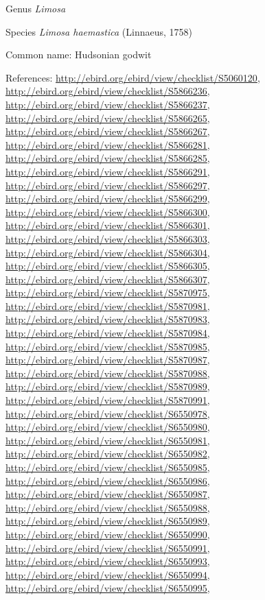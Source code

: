 \documentclass[9pt, article]{memoir}
\begin{document}
\begin{multicols}{2}
\vspace{6pt}\noindent\hspace{30pt}Genus \textit{Limosa}


\vspace{6pt}\noindent\hspace{36pt}Species \textit{Limosa haemastica} (Linnaeus, 1758)


Common name: Hudsonian godwit

References: 
\url{http://ebird.org/ebird/view/checklist/S5060120}, 
\url{http://ebird.org/ebird/view/checklist/S5866236}, 
\url{http://ebird.org/ebird/view/checklist/S5866237}, 
\url{http://ebird.org/ebird/view/checklist/S5866265}, 
\url{http://ebird.org/ebird/view/checklist/S5866267}, 
\url{http://ebird.org/ebird/view/checklist/S5866281}, 
\url{http://ebird.org/ebird/view/checklist/S5866285}, 
\url{http://ebird.org/ebird/view/checklist/S5866291}, 
\url{http://ebird.org/ebird/view/checklist/S5866297}, 
\url{http://ebird.org/ebird/view/checklist/S5866299}, 
\url{http://ebird.org/ebird/view/checklist/S5866300}, 
\url{http://ebird.org/ebird/view/checklist/S5866301}, 
\url{http://ebird.org/ebird/view/checklist/S5866303}, 
\url{http://ebird.org/ebird/view/checklist/S5866304}, 
\url{http://ebird.org/ebird/view/checklist/S5866305}, 
\url{http://ebird.org/ebird/view/checklist/S5866307}, 
\url{http://ebird.org/ebird/view/checklist/S5870975}, 
\url{http://ebird.org/ebird/view/checklist/S5870981}, 
\url{http://ebird.org/ebird/view/checklist/S5870983}, 
\url{http://ebird.org/ebird/view/checklist/S5870984}, 
\url{http://ebird.org/ebird/view/checklist/S5870985}, 
\url{http://ebird.org/ebird/view/checklist/S5870987}, 
\url{http://ebird.org/ebird/view/checklist/S5870988}, 
\url{http://ebird.org/ebird/view/checklist/S5870989}, 
\url{http://ebird.org/ebird/view/checklist/S5870991}, 
\url{http://ebird.org/ebird/view/checklist/S6550978}, 
\url{http://ebird.org/ebird/view/checklist/S6550980}, 
\url{http://ebird.org/ebird/view/checklist/S6550981}, 
\url{http://ebird.org/ebird/view/checklist/S6550982}, 
\url{http://ebird.org/ebird/view/checklist/S6550985}, 
\url{http://ebird.org/ebird/view/checklist/S6550986}, 
\url{http://ebird.org/ebird/view/checklist/S6550987}, 
\url{http://ebird.org/ebird/view/checklist/S6550988}, 
\url{http://ebird.org/ebird/view/checklist/S6550989}, 
\url{http://ebird.org/ebird/view/checklist/S6550990}, 
\url{http://ebird.org/ebird/view/checklist/S6550991}, 
\url{http://ebird.org/ebird/view/checklist/S6550993}, 
\url{http://ebird.org/ebird/view/checklist/S6550994}, 
\url{http://ebird.org/ebird/view/checklist/S6550995}, 

\end{multicols}
\end{document}
